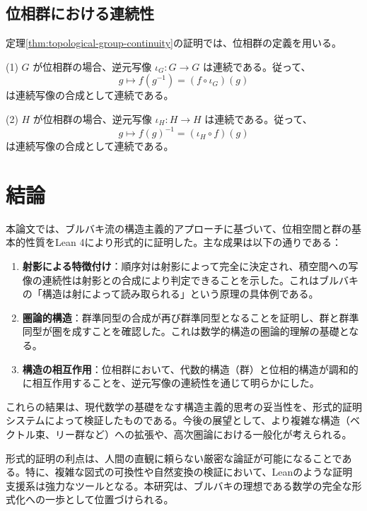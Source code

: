 \documentclass[uplatex, a4paper]{jlreq}
\newcommand{\comp}{\circ}
\newcommand{\inv}{^{-1}}
\begin{document}
\subsection{位相群における連続性}

定理\ref{thm:topological-group-continuity}の証明では、位相群の定義を用いる。

(1) $G$ が位相群の場合、逆元写像 $\iota_G: G \to G$ は連続である。従って、
\[
g \mapsto f(g\inv) = (f \comp \iota_G)(g)
\]
は連続写像の合成として連続である。

(2) $H$ が位相群の場合、逆元写像 $\iota_H: H \to H$ は連続である。従って、
\[
g \mapsto f(g)\inv = (\iota_H \comp f)(g)
\]
は連続写像の合成として連続である。

\section{結論}

本論文では、ブルバキ流の構造主義的アプローチに基づいて、位相空間と群の基本的性質をLean 4により形式的に証明した。主な成果は以下の通りである：

\begin{enumerate}
\item \textbf{射影による特徴付け}：順序対は射影によって完全に決定され、積空間への写像の連続性は射影との合成により判定できることを示した。これはブルバキの「構造は射によって読み取られる」という原理の具体例である。

\item \textbf{圏論的構造}：群準同型の合成が再び群準同型となることを証明し、群と群準同型が圏を成すことを確認した。これは数学的構造の圏論的理解の基礎となる。

\item \textbf{構造の相互作用}：位相群において、代数的構造（群）と位相的構造が調和的に相互作用することを、逆元写像の連続性を通じて明らかにした。

\end{enumerate}

これらの結果は、現代数学の基礎をなす構造主義的思考の妥当性を、形式的証明システムによって検証したものである。今後の展望として、より複雑な構造（ベクトル束、リー群など）への拡張や、高次圏論における一般化が考えられる。

形式的証明の利点は、人間の直観に頼らない厳密な論証が可能になることである。特に、複雑な図式の可換性や自然変換の検証において、Leanのような証明支援系は強力なツールとなる。本研究は、ブルバキの理想である数学の完全な形式化への一歩として位置づけられる。
\end{document}
